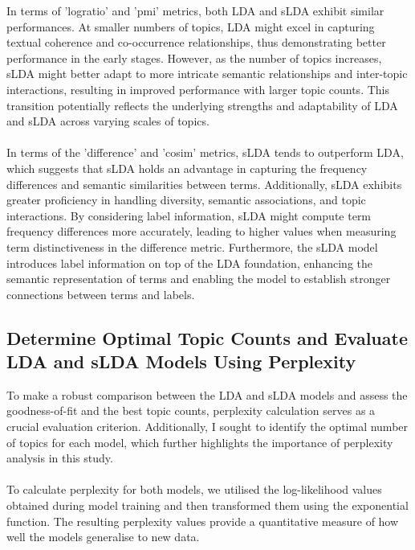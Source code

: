 \documentclass[12pt,twoside]{article}
\begin{document}
In terms of 'logratio' and 'pmi' metrics, both LDA and sLDA exhibit similar performances. At smaller numbers of topics, LDA might excel in capturing textual coherence and co-occurrence relationships, thus demonstrating better performance in the early stages. However, as the number of topics increases, sLDA might better adapt to more intricate semantic relationships and inter-topic interactions, resulting in improved performance with larger topic counts. This transition potentially reflects the underlying strengths and adaptability of LDA and sLDA across varying scales of topics.\\\\

In terms of the 'difference' and 'cosim' metrics, sLDA tends to outperform LDA, which suggests that sLDA holds an advantage in capturing the frequency differences and semantic similarities between terms. Additionally, sLDA exhibits greater proficiency in handling diversity, semantic associations, and topic interactions. By considering label information, sLDA might compute term frequency differences more accurately, leading to higher values when measuring term distinctiveness in the difference metric. Furthermore, the sLDA model introduces label information on top of the LDA foundation, enhancing the semantic representation of terms and enabling the model to establish stronger connections between terms and labels.


\subsection{Determine Optimal Topic Counts and Evaluate LDA and sLDA Models Using Perplexity}

To make a robust comparison between the LDA and sLDA models and assess the goodness-of-fit and the best topic counts, perplexity calculation serves as a crucial evaluation criterion. Additionally, I sought to identify the optimal number of topics for each model, which further highlights the importance of perplexity analysis in this study.\\\\

To calculate perplexity for both models, we utilised the log-likelihood values obtained during model training and then transformed them using the exponential function. The resulting perplexity values provide a quantitative measure of how well the models generalise to new data.\\\\
\end{document}
